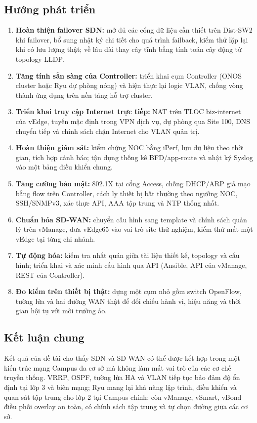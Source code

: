 \subsection{Hướng phát triển}

\begin{enumerate}
    \item \textbf{Hoàn thiện failover SDN:} mở đủ các cổng dữ liệu cần thiết trên Dist-SW2 khi failover, bổ sung nhật ký chi tiết cho quá trình failback, kiểm thử lặp lại khi có lưu lượng thật; về lâu dài thay cây tĩnh bằng tính toán cây động từ topology LLDP.
    \item \textbf{Tăng tính sẵn sàng của Controller:} triển khai cụm Controller (ONOS cluster hoặc Ryu dự phòng nóng) và hiện thực lại logic VLAN, chống vòng thành ứng dụng trên nền tảng hỗ trợ cluster.
    \item \textbf{Triển khai truy cập Internet trực tiếp:} NAT trên TLOC biz-internet của vEdge, tuyến mặc định trong VPN dịch vụ, dự phòng qua Site 100, DNS chuyển tiếp và chính sách chặn Internet cho VLAN quản trị.
    \item \textbf{Hoàn thiện giám sát:} kiểm chứng NOC bằng iPerf, lưu dữ liệu theo thời gian, tích hợp cảnh báo; tận dụng thống kê BFD/app-route và nhật ký Syslog vào một bảng điều khiển chung.
    \item \textbf{Tăng cường bảo mật:} 802.1X tại cổng Access, chống DHCP/ARP giả mạo bằng flow trên Controller, cách ly thiết bị bất thường theo ngưỡng NOC, SSH/SNMPv3, xác thực API, AAA tập trung và NTP thống nhất.
    \item \textbf{Chuẩn hóa SD-WAN:} chuyển cấu hình sang template và chính sách quản lý trên vManage, đưa vEdge65 vào vai trò site thử nghiệm, kiểm thử mất một vEdge tại từng chi nhánh.
    \item \textbf{Tự động hóa:} kiểm tra nhất quán giữa tài liệu thiết kế, topology và cấu hình; triển khai và xác minh cấu hình qua API (Ansible, API của vManage, REST của Controller).
    \item \textbf{Đo kiểm trên thiết bị thật:} dựng một cụm nhỏ gồm switch OpenFlow, tường lửa và hai đường WAN thật để đối chiếu hành vi, hiệu năng và thời gian hội tụ với môi trường ảo.
\end{enumerate}

\subsection{Kết luận chung}

Kết quả của đề tài cho thấy SDN và SD-WAN có thể được kết hợp trong một kiến trúc mạng Campus đa cơ sở mà không làm mất vai trò của các cơ chế truyền thống. VRRP, OSPF, tường lửa HA và VLAN tiếp tục bảo đảm độ ổn định tại lớp 3 và biên mạng; Ryu mang lại khả năng lập trình, điều khiển và quan sát tập trung cho lớp 2 tại Campus chính; còn vManage, vSmart, vBond điều phối overlay an toàn, có chính sách tập trung và tự chọn đường giữa các cơ sở.

